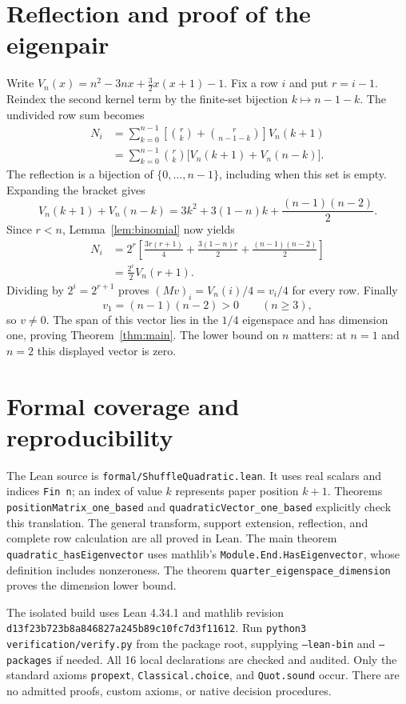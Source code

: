 \documentclass[11pt]{article}
\begin{document}
\section{Reflection and proof of the eigenpair}
Write $V_n(x)=n^2-3nx+\tfrac32x(x+1)-1$. Fix a row $i$ and put $r=i-1$. Reindex the second kernel term by the finite-set bijection $k\mapsto n-1-k$. The undivided row sum becomes
\begin{align*}
 N_i
 &=\sum_{k=0}^{n-1}\left[\binom rk+\binom r{n-1-k}\right]V_n(k+1)\\
 &=\sum_{k=0}^{n-1}\binom rk\bigl[V_n(k+1)+V_n(n-k)\bigr].
\end{align*}
The reflection is a bijection of $\{0,\ldots,n-1\}$, including when this set is empty. Expanding the bracket gives
\[
 V_n(k+1)+V_n(n-k)
 =3k^2+3(1-n)k+\frac{(n-1)(n-2)}2.
\]
Since $r<n$, Lemma~\ref{lem:binomial} now yields
\begin{align*}
 N_i&=2^r\left[\frac{3r(r+1)}4+\frac{3(1-n)r}2+\frac{(n-1)(n-2)}2\right]\\
 &=\frac{2^r}{2}V_n(r+1).
\end{align*}
Dividing by $2^i=2^{r+1}$ proves $(Mv)_i=V_n(i)/4=v_i/4$ for every row. Finally
\[
 v_1=(n-1)(n-2)>0\qquad(n\geq3),
\]
so $v\ne0$. The span of this vector lies in the $1/4$ eigenspace and has dimension one, proving Theorem~\ref{thm:main}. The lower bound on $n$ matters: at $n=1$ and $n=2$ this displayed vector is zero.

\section{Formal coverage and reproducibility}
The Lean source is \texttt{formal/ShuffleQuadratic.lean}. It uses real scalars and indices \texttt{Fin n}; an index of value $k$ represents paper position $k+1$. Theorems \texttt{positionMatrix\_one\_based} and \texttt{quadraticVector\_one\_based} explicitly check this translation. The general transform, support extension, reflection, and complete row calculation are all proved in Lean. The main theorem \texttt{quadratic\_hasEigenvector} uses mathlib's \texttt{Module.End.HasEigenvector}, whose definition includes nonzeroness. The theorem \texttt{quarter\_eigenspace\_dimension} proves the dimension lower bound.

The isolated build uses Lean 4.34.1 and mathlib revision \texttt{d13f23b723b8a846827a245b89c10fc7d3f11612}. Run \texttt{python3 verification/verify.py} from the package root, supplying \texttt{--lean-bin} and \texttt{--packages} if needed. All 16 local declarations are checked and audited. Only the standard axioms \texttt{propext}, \texttt{Classical.choice}, and \texttt{Quot.sound} occur. There are no admitted proofs, custom axioms, or native decision procedures.
\end{document}
